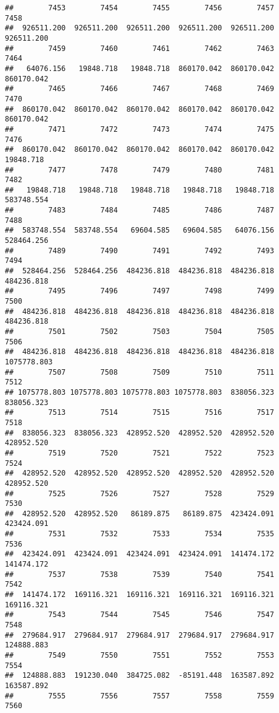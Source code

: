 \documentclass[
]{book}
\begin{document}
\begin{verbatim}
##        7453        7454        7455        7456        7457        7458 
##  926511.200  926511.200  926511.200  926511.200  926511.200  926511.200 
##        7459        7460        7461        7462        7463        7464 
##   64076.156   19848.718   19848.718  860170.042  860170.042  860170.042 
##        7465        7466        7467        7468        7469        7470 
##  860170.042  860170.042  860170.042  860170.042  860170.042  860170.042 
##        7471        7472        7473        7474        7475        7476 
##  860170.042  860170.042  860170.042  860170.042  860170.042   19848.718 
##        7477        7478        7479        7480        7481        7482 
##   19848.718   19848.718   19848.718   19848.718   19848.718  583748.554 
##        7483        7484        7485        7486        7487        7488 
##  583748.554  583748.554   69604.585   69604.585   64076.156  528464.256 
##        7489        7490        7491        7492        7493        7494 
##  528464.256  528464.256  484236.818  484236.818  484236.818  484236.818 
##        7495        7496        7497        7498        7499        7500 
##  484236.818  484236.818  484236.818  484236.818  484236.818  484236.818 
##        7501        7502        7503        7504        7505        7506 
##  484236.818  484236.818  484236.818  484236.818  484236.818 1075778.803 
##        7507        7508        7509        7510        7511        7512 
## 1075778.803 1075778.803 1075778.803 1075778.803  838056.323  838056.323 
##        7513        7514        7515        7516        7517        7518 
##  838056.323  838056.323  428952.520  428952.520  428952.520  428952.520 
##        7519        7520        7521        7522        7523        7524 
##  428952.520  428952.520  428952.520  428952.520  428952.520  428952.520 
##        7525        7526        7527        7528        7529        7530 
##  428952.520  428952.520   86189.875   86189.875  423424.091  423424.091 
##        7531        7532        7533        7534        7535        7536 
##  423424.091  423424.091  423424.091  423424.091  141474.172  141474.172 
##        7537        7538        7539        7540        7541        7542 
##  141474.172  169116.321  169116.321  169116.321  169116.321  169116.321 
##        7543        7544        7545        7546        7547        7548 
##  279684.917  279684.917  279684.917  279684.917  279684.917  124888.883 
##        7549        7550        7551        7552        7553        7554 
##  124888.883  191230.040  384725.082  -85191.448  163587.892  163587.892 
##        7555        7556        7557        7558        7559        7560 

\end{verbatim}
\end{document}
